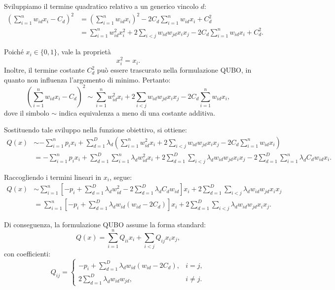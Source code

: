 \documentclass[a4paper,12pt]{article}
\begin{document}
Sviluppiamo il termine quadratico relativo a un generico vincolo \(d\):
\begin{align}
\left(\sum_{i=1}^{n} w_{id}x_i - C_d\right)^2
&= \left(\sum_{i=1}^{n} w_{id}x_i\right)^2 - 2C_d\sum_{i=1}^{n} w_{id}x_i + C_d^2 \\
&= \sum_{i=1}^{n} w_{id}^2 x_i^2 + 2\sum_{i<j} w_{id}w_{jd}x_ix_j - 2C_d\sum_{i=1}^{n} w_{id}x_i + C_d^2.
\end{align}

Poiché \(x_i \in \{0,1\}\), vale la proprietà
\[
x_i^2 = x_i.
\]
Inoltre, il termine costante \(C_d^2\) può essere trascurato nella formulazione QUBO, in quanto non influenza l'argomento di minimo. Pertanto:
\begin{equation}
\left(\sum_{i=1}^{n} w_{id}x_i - C_d\right)^2
\sim
\sum_{i=1}^{n} w_{id}^2 x_i + 2\sum_{i<j} w_{id}w_{jd}x_ix_j - 2C_d\sum_{i=1}^{n} w_{id}x_i,
\end{equation}
dove il simbolo \(\sim\) indica equivalenza a meno di una costante additiva.

Sostituendo tale sviluppo nella funzione obiettivo, si ottiene:
\begin{align}
Q(x)
&\sim -\sum_{i=1}^{n} p_i x_i
+ \sum_{d=1}^{D} \lambda_d \left(
\sum_{i=1}^{n} w_{id}^2 x_i
+ 2\sum_{i<j} w_{id}w_{jd}x_ix_j
- 2C_d\sum_{i=1}^{n} w_{id}x_i
\right) \\
&= -\sum_{i=1}^{n} p_i x_i
+ \sum_{d=1}^{D}\sum_{i=1}^{n} \lambda_d w_{id}^2 x_i
+ 2\sum_{d=1}^{D}\sum_{i<j} \lambda_d w_{id}w_{jd}x_ix_j
- 2\sum_{d=1}^{D}\sum_{i=1}^{n} \lambda_d C_d w_{id}x_i.
\end{align}

Raccogliendo i termini lineari in \(x_i\), segue:
\begin{align}
Q(x)
&\sim
\sum_{i=1}^{n}
\left[
-p_i + \sum_{d=1}^{D} \lambda_d w_{id}^2 - 2\sum_{d=1}^{D} \lambda_d C_d w_{id}
\right]x_i
+ 2\sum_{d=1}^{D}\sum_{i<j} \lambda_d w_{id}w_{jd}x_ix_j \\
&=
\sum_{i=1}^{n}
\left[
-p_i + \sum_{d=1}^{D} \lambda_d w_{id}(w_{id}-2C_d)
\right]x_i
+ 2\sum_{d=1}^{D}\sum_{i<j} \lambda_d w_{id}w_{jd}x_ix_j.
\end{align}

Di conseguenza, la formulazione QUBO assume la forma standard:
\begin{equation}
Q(x)=\sum_{i=1}^{n} Q_{ii}x_i + \sum_{i<j} Q_{ij}x_ix_j,
\end{equation}
con coefficienti:
\begin{equation}
Q_{ij}=
\begin{cases}
-p_i + \displaystyle\sum_{d=1}^{D} \lambda_d w_{id}(w_{id}-2C_d), & i=j, \\[1.2ex]
2\displaystyle\sum_{d=1}^{D} \lambda_d w_{id}w_{jd}, & i\neq j.
\end{cases}
\end{equation}
\end{document}
